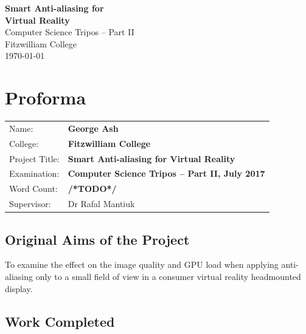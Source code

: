 \documentclass[12pt,a4paper,twoside,openright]{report}
\begin{document}





\pagestyle{empty}


\vspace*{60mm}
\begin{center}
\Huge
\textbf{Smart Anti-aliasing for\\ Virtual Reality} \\[5mm]
Computer Science Tripos -- Part II \\[5mm]
Fitzwilliam College \\[5mm]
\today  %
\end{center}


\pagestyle{plain}

\chapter*{Proforma}

{\large
\begin{tabular}{ll}
Name:               & \bf George Ash                       \\
College:            & \bf Fitzwilliam College                     \\
Project Title:      & \bf Smart Anti-aliasing for Virtual Reality \\
Examination:        & \bf Computer Science Tripos -- Part II, July 2017  \\
Word Count:         & \bf /*TODO*/ \\
Supervisor:         & Dr Rafal Mantiuk                    \\ 
\end{tabular}
}

\section*{Original Aims of the Project}

To examine the effect on the image quality and GPU load when applying anti-aliasing only to a small field of view in a consumer virtual reality headmounted display.

\section*{Work Completed}
\end{document}

